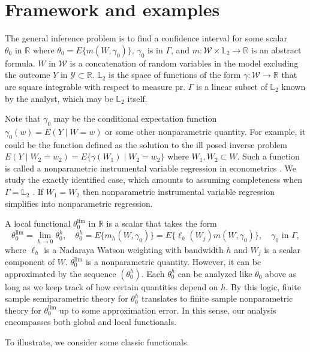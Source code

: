 \section{Framework and examples}\label{sec:framework}

The general inference problem is to find a confidence interval for some scalar $\theta_0\text{ in }\mathbb{R}$ where
$
\theta_0=E\{m(W,\gamma_0)\}$, $\gamma_0$ is in $\Gamma$,
and $m:\mathcal{W}\times \mathbb{L}_2\rightarrow{\mathbb{R}}$ is an abstract formula. $W\text{ in }\mathcal{W}$ is a concatenation of random variables in the model excluding the outcome $Y\text{ in }\mathcal{Y}\subset\mathbb{R}$.  $\mathbb{L}_2$ is the space of functions of the form $\gamma:\mathcal{W}\rightarrow \mathbb{R}$ that are square integrable with respect to measure $\text{pr}$. $\Gamma$ is a linear subset of $\mathbb{L}_2$ known by the analyst, which may be $\mathbb{L}_2$ itself. 

Note that $\gamma_0$ may be the conditional expectation function $\gamma_0(w)=E(Y \mid W=w)$ or some other nonparametric quantity. For example, it could be the function defined as the solution to the ill posed inverse problem $E(Y \mid W_2=w_2)=E\{\gamma(W_1) \mid W_2=w_2\}$ where $W_1,W_2\subset W$. Such a function is called a nonparametric instrumental variable regression in econometrics \cite{newey2003instrumental}. We study the exactly identified case, which amounts to assuming completeness when $\Gamma=\mathbb{L}_2$ \cite{chen2018overidentification}. If $W_1=W_2$ then nonparametric instrumental variable regression simplifies into nonparametric regression. 

A local functional $\theta_0^{\lim}$ in $\mathbb{R}$ is a scalar that takes the form
$$
\theta^{\lim}_{0}=\lim_{h\rightarrow 0} \theta_0^h,\quad \theta_0^h=E\{m_h(W,\gamma_0)\}=E\{\ell_h(W_j) m(W,\gamma_0)\},\quad \gamma_0 \text{ in } \Gamma,
$$
where $\ell_h$ is a Nadaraya Watson weighting with bandwidth $h$ and $W_j$ is a scalar component of $W$. $\theta^{\lim}_{0}$ is a nonparametric quantity. However, it can be approximated by the sequence $(\theta_0^h)$. Each $\theta_0^h$ can be analyzed like $\theta_0$ above as long as we keep track of how certain quantities depend on $h$. By this logic, finite sample semiparametric theory for $\theta^h_0$ translates to finite sample nonparametric theory for $\theta_0^{\lim}$ up to some approximation error. In this sense, our analysis encompasses both global and local functionals.

To illustrate, we consider some classic functionals.

